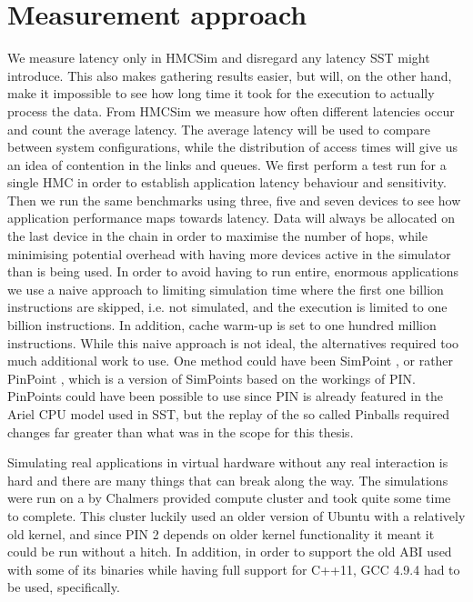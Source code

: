 

\section{Measurement approach}
We measure latency only in HMCSim and disregard any latency SST might introduce. This also makes gathering results easier, but will, on the other hand, make it impossible to see how long time it took for the execution to actually process the data. From HMCSim we measure how often different latencies occur and count the average latency. The average latency will be used to compare between system configurations, while the distribution of access times will give us an idea of contention in the links and queues. We first perform a test run for a single HMC in order to establish application latency behaviour and sensitivity. Then we run the same benchmarks using three, five and seven devices to see how application performance maps towards latency. Data will always be allocated on the last device in the chain in order to maximise the number of hops, while minimising potential overhead with having more devices active in the simulator than is being used. In order to avoid having to run entire, enormous applications we use a naive approach to limiting simulation time where the first one billion instructions are skipped, i.e. not simulated, and the execution is limited to one billion instructions. In addition, cache warm-up is set to one hundred million instructions. While this naive approach is not ideal, the alternatives required too much additional work to use. One method could have been SimPoint \cite{hamerly2005simpoint}, or rather PinPoint \cite{pinplay2010patil}, which is a version of SimPoints based on the workings of PIN. PinPoints could have been possible to use since PIN is already featured in the Ariel CPU model used in SST, but the replay of the so called Pinballs required changes far greater than what was in the scope for this thesis.
\bigskip

Simulating real applications in virtual hardware without any real interaction is hard and there are many things that can break along the way. The simulations were run on a by Chalmers provided compute cluster and took quite some time to complete. This cluster luckily used an older version of Ubuntu with a relatively old kernel, and since PIN 2 depends on older kernel functionality it meant it could be run without a hitch. In addition, in order to support the old ABI used with some of its binaries while having full support for C++11, GCC 4.9.4 had to be used, specifically. 
\bigskip

